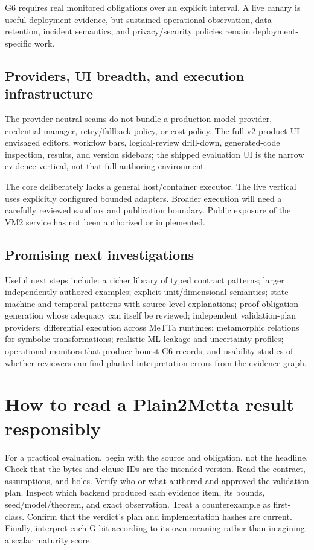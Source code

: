 \documentclass[11pt]{article}
\begin{document}
G6 requires real monitored obligations over an explicit interval.  A live
canary is useful deployment evidence, but sustained operational observation,
data retention, incident semantics, and privacy/security policies remain
deployment-specific work.

\subsection{Providers, UI breadth, and execution infrastructure}

The provider-neutral seams do not bundle a production model provider,
credential manager, retry/fallback policy, or cost policy.  The full v2 product
UI envisaged editors, workflow bars, logical-review drill-down, generated-code
inspection, results, and version sidebars; the shipped evaluation UI is the
narrow evidence vertical, not that full authoring environment.

The core deliberately lacks a general host/container executor.  The live
vertical uses explicitly configured bounded adapters.  Broader execution will
need a carefully reviewed sandbox and publication boundary.  Public exposure
of the VM2 service has not been authorized or implemented.

\subsection{Promising next investigations}

Useful next steps include: a richer library of typed contract patterns;
larger independently authored examples; explicit unit/dimensional semantics;
state-machine and temporal patterns with source-level explanations; proof
obligation generation whose adequacy can itself be reviewed; independent
validation-plan providers; differential execution across MeTTa runtimes;
metamorphic relations for symbolic transformations; realistic ML leakage and
uncertainty profiles; operational monitors that produce honest G6 records;
and usability studies of whether reviewers can find planted interpretation
errors from the evidence graph.

\section{How to read a Plain2Metta result responsibly}

For a practical evaluation, begin with the source and obligation, not the
headline.  Check that the bytes and clause IDs are the intended version.  Read
the contract, assumptions, and holes.  Verify who or what authored and
approved the validation plan.  Inspect which backend produced each evidence
item, its bounds, seed/model/theorem, and exact observation.  Treat a
counterexample as first-class.  Confirm that the verdict's plan and
implementation hashes are current.  Finally, interpret each G bit according
to its own meaning rather than imagining a scalar maturity score.
\end{document}
